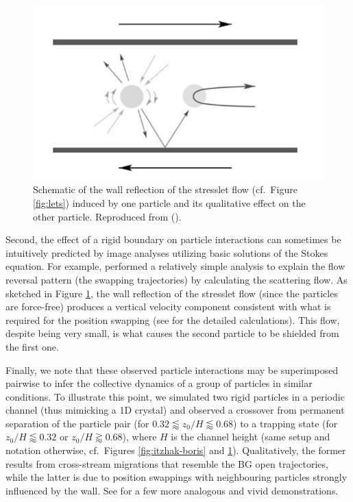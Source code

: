 \begin{figure}%
  \centering
  \includegraphics[width=0.55\columnwidth]{stresslet_reflection.png}
  \caption{Schematic of the wall reflection of the stresslet flow (cf.\ Figure \ref{fig:lets}) induced by one particle and its qualitative effect on the other particle. Reproduced from \cite{zurita-gotor_2007} ().}
  \label{fig:stresslet-refl}
\end{figure}

Second, the effect of a rigid boundary on particle interactions can sometimes be intuitively predicted by image analyses utilizing basic solutions of the Stokes equation.
For example, \cite{zurita-gotor_2007} performed a relatively simple analysis to explain the flow reversal pattern (\ie the swapping trajectories) by calculating the scattering flow.
As sketched in Figure \ref{fig:stresslet-refl}, the wall reflection of the stresslet flow (since the particles are force-free) produces a vertical velocity component consistent with what is required for the position swapping (see \cite{zurita-gotor_2007} for the detailed calculations). This flow, despite being very small, is what causes the second particle to be shielded from the first one.

Finally, we note that these observed particle interactions may be superimposed pairwise to infer the collective dynamics of a group of particles in similar conditions.
To illustrate this point, we simulated two rigid particles in a periodic channel (thus mimicking a 1D crystal) and observed a crossover from permanent separation of the particle pair (for $0.32 \lessapprox z_0/H \lessapprox 0.68$) to a trapping state (for $z_0/H \lessapprox 0.32$ or $z_0/H \gtrapprox 0.68$), where $H$ is the channel height (same setup and notation otherwise, cf.\ Figures \ref{fig:itzhak-boris} and \ref{fig:stresslet-refl}).
Qualitatively, the former results from cross-stream migrations that resemble the BG open trajectories, while the latter is due to position swappings with neighbouring particles strongly influenced by the wall.
See \cite{Beatus2006, Janssen2012, Uspal2013} for a few more analogous and vivid demonstrations.

